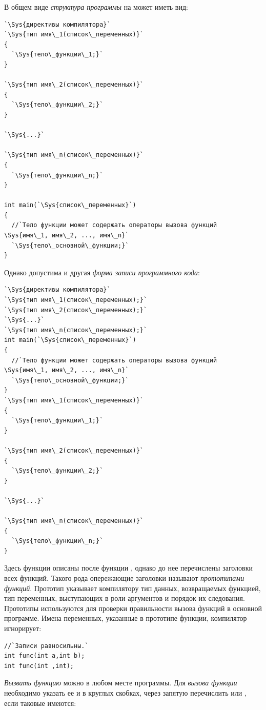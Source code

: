 В общем виде \emph{структура программы} на  может иметь вид:
\begin{lstlisting}
`\Sys{директивы компилятора}`
`\Sys{тип имя\_1(список\_переменных)}`
{
  `\Sys{тело\_функции\_1;}`
}

`\Sys{тип имя\_2(список\_переменных)}`
{
  `\Sys{тело\_функции\_2;}`
}

`\Sys{...}`

`\Sys{тип имя\_n(список\_переменных)}`
{
  `\Sys{тело\_функции\_n;}`
}

int main(`\Sys{список\_переменных}`)
{
  //`Тело функции может содержать операторы вызова функций \Sys{имя\_1, имя\_2, ..., имя\_n}`
  `\Sys{тело\_основной\_функции;}`
}
\end{lstlisting}
Однако допустима и другая \emph{форма записи программного кода}:

\begin{lstlisting}
`\Sys{директивы компилятора}`
`\Sys{тип имя\_1(список\_переменных);}`
`\Sys{тип имя\_2(список\_переменных);}`
`\Sys{...}`
`\Sys{тип имя\_n(список\_переменных);}`
int main(`\Sys{список\_переменных}`)
{
  //`Тело функции может содержать операторы вызова функций \Sys{имя\_1, имя\_2, ..., имя\_n}`
  `\Sys{тело\_основной\_функции;}`
}
`\Sys{тип имя\_1(список\_переменных)}`
{
  `\Sys{тело\_функции\_1;}`
}

`\Sys{тип имя\_2(список\_переменных)}`
{
  `\Sys{тело\_функции\_2;}`
}

`\Sys{...}`

`\Sys{тип имя\_n(список\_переменных)}`
{
  `\Sys{тело\_функции\_n;}`
}
\end{lstlisting}

Здесь функции описаны после функции , однако до нее перечислены заголовки всех функций. Такого
рода опережающие заголовки называют \emph{прототипами
функций}. Прототип указывает компилятору тип данных, возвращаемых функцией, тип переменных,
выступающих в роли аргументов и порядок их следования. Прототипы используются для проверки правильности вызова функций
в основной программе. Имена переменных, указанные в прототипе функции, компилятор игнорирует:
\begin{lstlisting}
//`Записи равносильны.`
int func(int a,int b);
int func(int ,int);
\end{lstlisting}

\emph{Вызвать функцию} можно в любом месте программы. Для \emph{вызова
функции} необходимо указать ее  и в круглых скобках, через запятую перечислить
 или , если таковые имеются:

